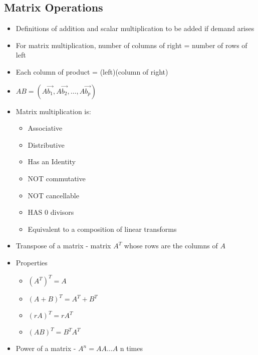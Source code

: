\documentclass{article}
\begin{document}
\subsection{Matrix Operations}
\begin{itemize}
    \item Definitions of addition and scalar multiplication to be added if demand arises 
    \item For matrix multiplication, number of columns of right = number of rows of left 
    \item Each column of product = (left)(column of right)
    \item \(AB=(A\vec{b_1},A\vec{b_2},\dots,A\vec{b_p})\)
    \item Matrix multiplication is:
    \begin{itemize}
        \item Associative 
        \item Distributive 
        \item Has an Identity
        \item NOT commutative
        \item NOT cancellable
        \item HAS 0 divisors
        \item Equivalent to a composition of linear transforms
    \end{itemize}
    \item Transpose of a matrix - matrix \(A^T\) whose rows are the columns of \(A\)
    \item Properties
    \begin{itemize}
        \item \((A^T)^T=A\)
        \item \((A+B)^T=A^T+B^T\)
        \item \((rA)^T=rA^T\)
        \item \((AB)^T=B^TA^T\)
    \end{itemize}
    \item Power of a matrix - \(A^n=AA\dots A\) n times
\end{itemize}
\end{document}
